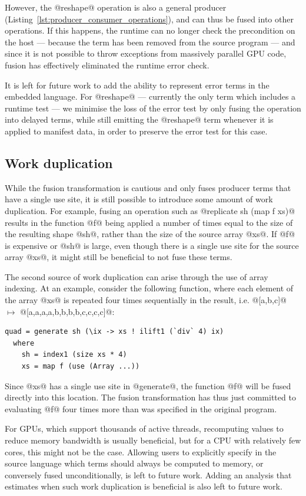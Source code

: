 However, the @reshape@ operation is also a general producer
(Listing~\ref{lst:producer_consumer_operations}), and can thus be fused into
other operations. If this happens, the runtime can no longer check the
precondition on the host --- because the term has been removed from the source
program --- and since it is not possible to throw exceptions from massively
parallel GPU code, fusion has effectively eliminated the runtime error check.

It is left for future work to add the ability to represent error terms in the
embedded language. For @reshape@ --- currently the only term which includes a
runtime test --- we minimise the loss of the error test by only fusing the
operation into delayed terms, while still emitting the @reshape@ term whenever
it is applied to manifest data, in order to preserve the error test for this
case.


\subsection{Work duplication}

While the fusion transformation is cautious and only fuses producer terms that
have a single use site, it is still possible to introduce some amount of work
duplication. For example, fusing an operation such as @replicate sh (map f xs)@
results in the function @f@ being applied a number of times equal to the size of
the resulting shape @sh@, rather than the size of the source array @xs@. If @f@
is expensive or @sh@ is large, even though there is a single use site for the
source array @xs@, it might still be beneficial to not fuse these terms.

The second source of work duplication can arise through the use of array
indexing. At an example, consider the following function, where each element of
the array @xs@ is repeated four times sequentially in the result, i.e.
@[a,b,c]@ $\mapsto$ @[a,a,a,a,b,b,b,b,c,c,c,c]@:
%
\begin{lstlisting}[style=haskell]
quad = generate sh (\ix -> xs ! ilift1 (`div` 4) ix)
  where
    sh = index1 (size xs * 4)
    xs = map f (use (Array ...))
\end{lstlisting}
%
Since @xs@ has a single use site in @generate@, the function @f@ will be fused
directly into this location. The fusion transformation has thus just committed
to evaluating @f@ four times more than was specified in the original program.

For GPUs, which support thousands of active threads, recomputing values to
reduce memory bandwidth is usually beneficial, but for a CPU with relatively few
cores, this might not be the case. Allowing users to explicitly specify in the
source language which terms should always be computed to memory, or conversely
fused unconditionally, is left to future work. Adding an analysis that estimates
when such work duplication is beneficial is also left to future work.


